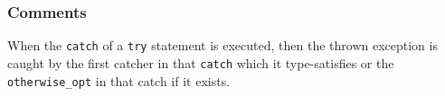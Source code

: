 \begin{mathpar}
\end{mathpar}

\subsubsection{Comments}
When the \texttt{catch} of a \texttt{try} statement is executed, then the
thrown exception is caught by the first catcher in that \texttt{catch} which it
type-satisfies or the \texttt{otherwise\_opt} in that catch if it exists.

